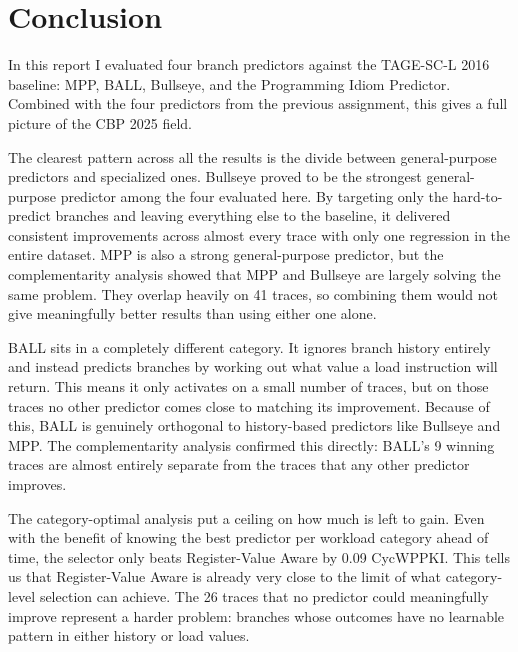 \documentclass[11pt,a4paper]{article}
\begin{document}
\section{Conclusion}

In this report I evaluated four branch predictors against the TAGE-SC-L 2016 
baseline: MPP, BALL, Bullseye, and the Programming Idiom Predictor. Combined 
with the four predictors from the previous assignment, this gives a full picture 
of the CBP 2025 field.

The clearest pattern across all the results is the divide between general-purpose 
predictors and specialized ones. Bullseye proved to be the strongest 
general-purpose predictor among the four evaluated here. By targeting only the 
hard-to-predict branches and leaving everything else to the baseline, it delivered 
consistent improvements across almost every trace with only one regression in the 
entire dataset. MPP is also a strong general-purpose predictor, but the 
complementarity analysis showed that MPP and Bullseye are largely solving the same 
problem. They overlap heavily on 41 traces, so combining them would not give 
meaningfully better results than using either one alone.

BALL sits in a completely different category. It ignores branch history entirely 
and instead predicts branches by working out what value a load instruction will 
return. This means it only activates on a small number of traces, but on those 
traces no other predictor comes close to matching its improvement. Because of 
this, BALL is genuinely orthogonal to history-based predictors like Bullseye and 
MPP. The complementarity analysis confirmed this directly: BALL's 9 winning traces 
are almost entirely separate from the traces that any other predictor improves.

The category-optimal analysis put a ceiling on how much is left to gain. Even with the
benefit of knowing the best predictor per workload category ahead of time, the
selector only beats Register-Value Aware by 0.09 CycWPPKI. This tells us that
Register-Value Aware is already very close to the limit of what category-level
selection can achieve. The 26 traces that no predictor could meaningfully improve
represent a harder problem: branches whose outcomes have no learnable pattern in
either history or load values.
\end{document}
